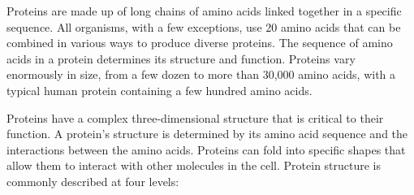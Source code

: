 Proteins are made up of long chains of amino acids linked together in a specific sequence. All organisms, with a few exceptions, use 20 amino acids that can be combined in various ways to produce diverse proteins. The sequence of amino acids in a protein determines its structure and function. Proteins vary enormously in size, from a few dozen to more than 30,000 amino acids, with a typical human protein containing a few hundred amino acids.

Proteins have a complex three-dimensional structure 
that is critical to their function. A protein's structure is determined by its amino acid sequence and the interactions between the amino acids.
Proteins can fold into specific shapes that allow them to interact with other molecules in the cell. Protein structure is commonly described at four levels:

